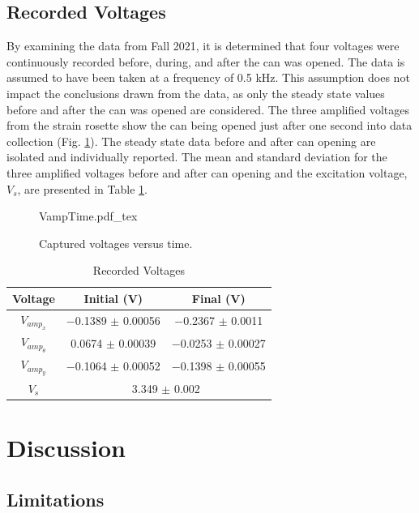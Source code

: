 \documentclass[10pt,journal,letterpaper]{IEEEtran}
\newcommand{\incfig}[1]{%
	\centering
    {#1.pdf_tex}
}
\begin{document}
\subsection{Recorded Voltages}

By examining the data from Fall 2021, it is determined that four voltages were continuously recorded before, during, and after the can was opened.
The data is assumed to have been taken at a frequency of 0.5 kHz.
This assumption does not impact the conclusions drawn from the data, as only the steady state values before and after the can was opened are considered.
The three amplified voltages from the strain rosette show the can being opened just after one second into data collection (Fig. \ref{fig:VampTime}).
The steady state data before and after can opening are isolated and individually reported.
The mean and standard deviation for the three amplified voltages before and after can opening and the excitation voltage, $V_s$, are presented in Table \ref{tab:RecV}.
\begin{figure}[H]
\def\svgwidth{2.75in}
\incfig{VampTime}
\caption{Captured voltages versus time.}
\label{fig:VampTime}
\end{figure}

\begin{table}[H]
\renewcommand\arraystretch{1.25}
\centering
\caption{Recorded Voltages}
\begin{tabular}{ccc}
\hline \hline
Voltage & Initial (V) & Final (V) \\
\hline
$V_{amp_x}$ & $-$0.1389 $\pm$ 0.00056 & $-$0.2367 $\pm$ 0.0011 \\
$V_{amp_\theta}$ & 0.0674 $\pm$ 0.00039 & $-$0.0253 $\pm$ 0.00027 \\
$V_{amp_y}$ & $-$0.1064 $\pm$ 0.00052 & $-$0.1398 $\pm$ 0.00055 \\
$V_{s}$ & \multicolumn{2}{c}{3.349 $\pm$ 0.002} \\
\hline \hline
\end{tabular}
\label{tab:RecV}
\end{table}

\section{Discussion}

\subsection{Limitations}
\end{document}
